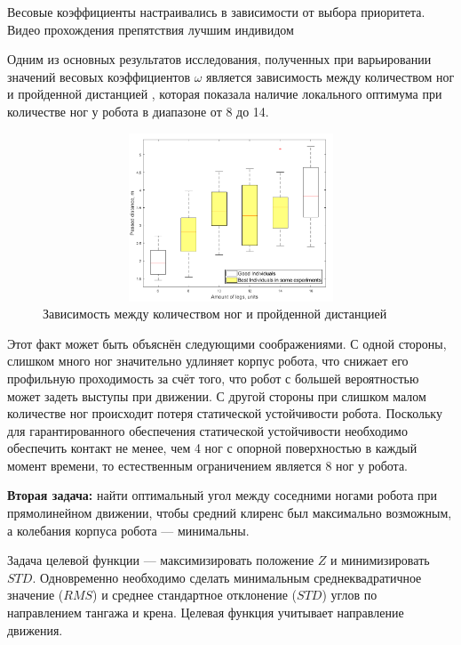 Весовые коэффициенты настраивались в зависимости от выбора приоритета. Видео прохождения препятствия лучшим индивидом \quad
{}

Одним из основных результатов исследования, полученных при варьировании значений весовых коэффициентов $\omega$ является зависимость между количеством ног и пройденной дистанцией , которая показала наличие локального оптимума при количестве ног у робота в диапазоне от 8 до 14. 

\begin{figure}[H]
    \centering\includegraphics[height=5cm,width=1\textwidth,keepaspectratio]{images/box_plot_structural_synthesis.png}
    \caption{Зависимость между количеством ног и пройденной дистанцией}
    \label{fig:box_plot_structural_synthesis.png}
\end{figure}

Этот факт может быть объяснён следующими соображениями. С одной стороны, слишком много ног значительно удлиняет корпус робота, что снижает его профильную проходимость за счёт того, что робот с большей вероятностью может задеть выступы при движении. С другой стороны при слишком малом количестве ног происходит потеря статической устойчивости робота. Поскольку для гарантированного обеспечения статической устойчивости необходимо обеспечить контакт не менее, чем 4 ног с опорной поверхностью в каждый момент времени, то естественным ограничением является 8 ног у робота.

\textbf{Вторая задача:} найти оптимальный угол между соседними ногами робота при прямолинейном движении, чтобы средний клиренс был максимально возможным, а колебания корпуса робота --- минимальны.

Задача целевой функции --- максимизировать положение $Z$ и минимизировать $STD$. Одновременно необходимо сделать минимальным среднеквадратичное значение ($RMS$) и среднее стандартное отклонение ($STD$) углов по направлением тангажа и крена. Целевая функция учитывает направление движения.


